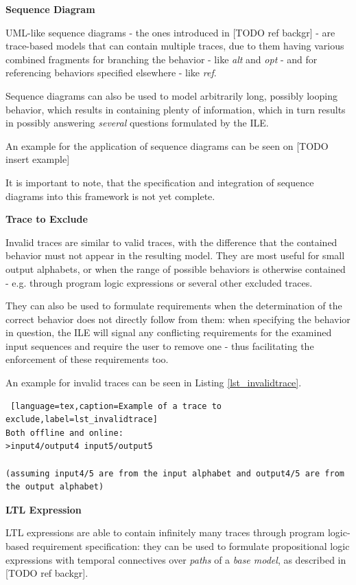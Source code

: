 \textbf{Sequence Diagram}

UML-like sequence diagrams - the ones introduced in [TODO ref backgr] - are trace-based models that can contain multiple traces, due to them having various combined fragments for branching the behavior - like \textit{alt} and \textit{opt} - and for referencing behaviors specified elsewhere - like \textit{ref}.

Sequence diagrams can also be used to model arbitrarily long, possibly looping behavior, which results in containing plenty of information, which in turn results in possibly answering \textit{several} questions formulated by the ILE.

An example for the application of sequence diagrams can be seen on [TODO insert example]

It is important to note, that the specification and integration of sequence diagrams into this framework is not yet complete. 

\textbf{Trace to Exclude}

Invalid traces are similar to valid traces, with the difference that the contained behavior must not appear in the resulting model. They are most useful for small output alphabets, or when the range of possible behaviors is otherwise contained - e.g. through program logic expressions or several other excluded traces.

They can also be used to formulate requirements when the determination of the correct behavior does not directly follow from them: when specifying the behavior in question, the ILE will signal any conflicting requirements for the examined input sequences and require the user to remove one - thus facilitating the enforcement of these requirements too.

An example for invalid traces can be seen in Listing \ref{lst_invalidtrace}.

\bigskip
\begin{lstlisting} [language=tex,caption=Example of a trace to exclude,label=lst_invalidtrace]
Both offline and online:
>input4/output4 input5/output5

(assuming input4/5 are from the input alphabet and output4/5 are from the output alphabet) 
\end{lstlisting}

\textbf{LTL Expression}

LTL expressions are able to contain infinitely many traces through program logic-based requirement specification: they can be used to formulate propositional logic expressions with temporal connectives over \textit{paths} of a \textit{base model}, as described in [TODO ref backgr]. 

